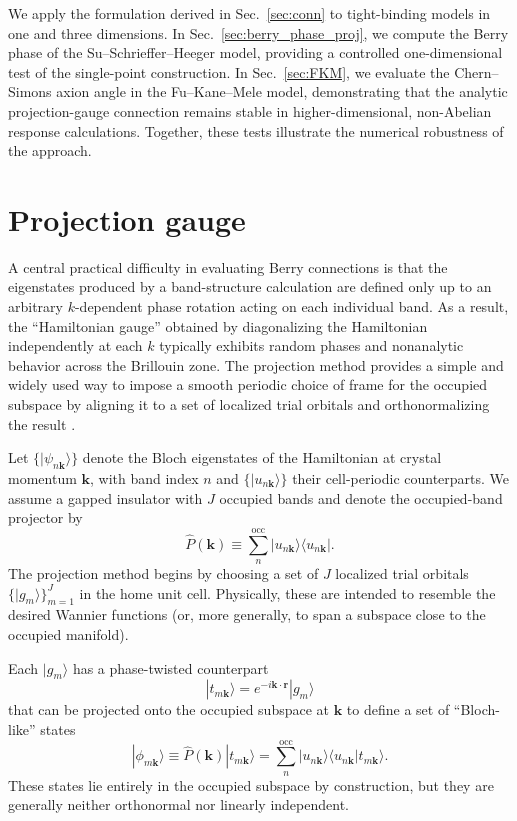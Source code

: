 \documentclass[galley,aps,pra,10pt,amsmath,amssymb,
    superscriptaddress,nofootinbib,longbibliography]{revtex4-2}
\begin{document}
We apply the formulation derived in Sec.~\ref{sec:conn} to tight-binding models in one and three dimensions. In Sec.~\ref{sec:berry_phase_proj}, we compute the Berry phase of the Su--Schrieffer--Heeger model, providing a controlled one-dimensional test of the single-point construction. In Sec.~\ref{sec:FKM}, we evaluate the Chern--Simons axion angle in the Fu--Kane--Mele model, demonstrating that the analytic projection-gauge connection remains stable in higher-dimensional, non-Abelian response calculations. Together, these tests illustrate the numerical robustness of the approach. 


\section{Projection gauge}
\label{sec:proj_gauge}

A central practical difficulty in evaluating Berry connections is that the eigenstates produced by a band-structure calculation are defined only up to an arbitrary $k$-dependent phase rotation acting on each individual band. As a result, the ``Hamiltonian gauge'' obtained by diagonalizing the Hamiltonian independently at each $k$ typically exhibits random phases and nonanalytic behavior across the Brillouin zone. The projection method provides a simple and widely used way to impose a smooth periodic choice of frame for the occupied subspace by aligning it to a set of localized trial orbitals and orthonormalizing the result \cite{souza2001, marzari2012}.

Let $\{|\psi_{n\mathbf{k}}\rangle\}$ denote the Bloch eigenstates of the Hamiltonian at crystal momentum $\mathbf{k}$, with band index $n$ and $\{|u_{n\mathbf{k}}\rangle\}$ their cell-periodic counterparts. We assume a gapped insulator with $J$ occupied bands and denote the occupied-band projector by
\begin{equation}
\label{eq:Pocc}
\hat{P}(\mathbf{k}) \equiv \sum_{n}^{\mathrm{occ}} |u_{n\mathbf{k}}\rangle\langle u_{n\mathbf{k}}|.
\end{equation}
The projection method begins by choosing a set of $J$ localized trial orbitals $\{|g_m\rangle\}_{m=1}^J$ in the home unit cell.
Physically, these are intended to resemble the desired Wannier functions (or, more generally, to span a subspace close to the occupied manifold).

Each $|g_m\rangle$ has a phase-twisted counterpart
\begin{equation}
    |t_{m\mathbf{k}} \rangle = e^{-i\mathbf{k}\cdot \mathbf{r}} | g_m \rangle
\end{equation}
that can be projected onto the occupied subspace at $\mathbf{k}$ to define a set of ``Bloch-like'' states
\begin{equation}
\label{eq:bloch-like}
|\phi_{m\mathbf{k}}\rangle
\equiv
\hat{P}(\mathbf{k})|t_{m\mathbf{k}}\rangle
=
\sum_{n}^{\mathrm{occ}} |u_{n\mathbf{k}}\rangle\langle u_{n\mathbf{k}}|t_{m \mathbf{k}}\rangle.
\end{equation}
These states lie entirely in the occupied subspace by construction, but they are generally neither orthonormal nor linearly independent.
\end{document}
